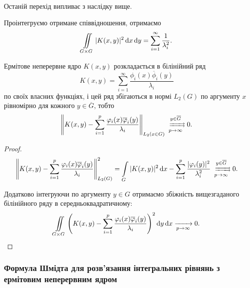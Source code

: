 \begin{remark}
    Останій перехід випливає з наслідку вище.
\end{remark}

Проінтегруємо отримане співвідношення, отримаємо
\begin{equation}
    \displaystyle\iint\limits_{G \times G} |K(x, y)|^2 \mathop{}\!\mathrm{d} x \mathop{}\!\mathrm{d} y = \displaystyle\sum\limits_{i = 1}^\infty \dfrac{1}{\lambda_i^2}.
\end{equation}

\begin{theorem}
    Ермітове неперервне ядро $K(x, y)$ розкладається в білінійний ряд
    \begin{equation}
        K(x, y) = \sum_{i=1}^\infty \frac{\phi_i(x) \overline \phi_i(y)}{\lambda_i}
    \end{equation}
    по своїх власних функціях, і цей ряд збігаються в нормі $L_2(G)$ по аргументу $x$ рівномірно для кожного $y \in \overline G$, тобто 
    \begin{equation}
        \left\| K(x, y) - \Sum_{i=1}^p \dfrac{\phi_i(x)\overline \phi_i(y)}{\lambda_i}\right\|_{L_2(x \in G)} \xrightrightarrows[p \to \infty]{y \in \overline G} 0.
    \end{equation}
\end{theorem}

\begin{proof}
    \begin{equation}
        \left\| K(x, y) - \Sum_{i = 1}^p \dfrac{\phi_i(x) \overline \phi_i(y)}{\lambda_i} \right\|_{L_2(G)}^2 = \Int_G |K(x, y)|^2 \diff x - \Sum_{i = 1}^p \dfrac{|\phi_i(y)|^2}{\lambda_i^2} \xrightrightarrows[p \to \infty]{y \in \overline G} 0.
    \end{equation}

    Додатково інтегруючи по аргументу $y \in G$ отримаємо збіжність вищезгаданого білінійного ряду в середньоквадратичному:
    \begin{equation}
        \displaystyle\iint\limits_{G \times G} \left( K(x, y) - \displaystyle\sum\limits_{i = 1}^p \dfrac{\varphi_i(x) \overline {\varphi}_i(y)}{\lambda_i} \right)^2 \mathop{}\!\mathrm{d} y \mathop{}\!\mathrm{d} x\xrightarrow[p \to \infty]{} 0.
    \end{equation}
\end{proof}

\subsubsection{Формула Шмідта для розв'язання інтегральних рівнянь з ермітовим неперервним ядром}

